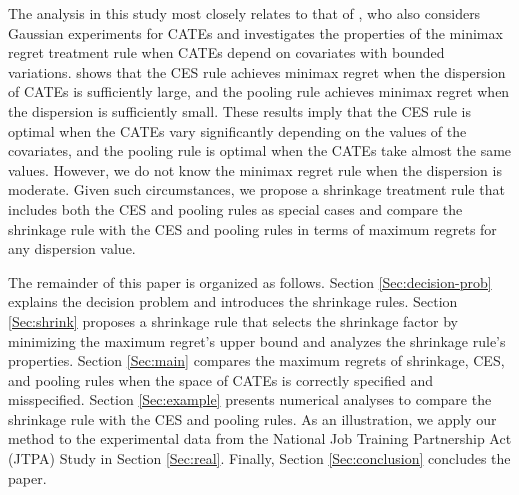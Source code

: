 \documentclass[12pt,a4paper]{article}
\newcommand{\dk}[1]{{ \color{blue}[DK: #1]}}
\begin{document}
The analysis in this study most closely relates to that of \cite{stoye2012minimax}, who also considers Gaussian experiments for CATEs and investigates the properties of the minimax regret treatment rule when CATEs depend on covariates with bounded variations. \cite{stoye2012minimax} shows that the CES rule achieves minimax regret when the dispersion of CATEs is sufficiently large, and the pooling rule achieves minimax regret when the dispersion is sufficiently small. These results imply that the CES rule is optimal when the CATEs vary significantly depending on the values of the covariates, and the pooling rule is optimal when the CATEs take almost the same values. However, we do not know the minimax regret rule when the dispersion is moderate. Given such circumstances, we propose a shrinkage treatment rule that includes both the CES and pooling rules as special cases and compare the shrinkage rule with the CES and pooling rules in terms of maximum regrets for any dispersion value.


The remainder of this paper is organized as follows. Section \ref{Sec:decision-prob} explains the decision problem and introduces the shrinkage rules. Section \ref{Sec:shrink} proposes a shrinkage rule that selects the shrinkage factor by minimizing the maximum regret's upper bound and analyzes the shrinkage rule's properties. Section \ref{Sec:main} compares the maximum regrets of shrinkage, CES, and pooling rules when the space of CATEs is correctly specified and misspecified. Section \ref{Sec:example} presents numerical analyses to compare the shrinkage rule with the CES and pooling rules. As an illustration, we apply our method to the experimental data from the National Job Training Partnership Act (JTPA) Study in Section \ref{Sec:real}. Finally, Section \ref{Sec:conclusion} concludes the paper.
\end{document}
